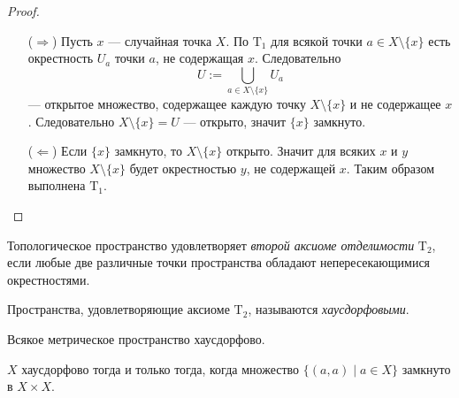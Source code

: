 \documentclass[12pt,a4paper]{article}
\newcommand{\T}{\ensuremath{\mathrm{T}}\xspace}
\begin{document}
    \begin{proof}
        \begin{itemize}
            \item[($\Rightarrow$)] Пусть $x$ --- случайная точка $X$. По $\T_1$ для всякой точки $a \in X \setminus \{x\}$ есть окрестность $U_a$ точки $a$, не содержащая $x$. Следовательно
                \[U := \bigcup_{a \in X \setminus \{x\}} U_a\]
                --- открытое множество, содержащее каждую точку $X \setminus \{x\}$ и не содержащее $x$. Следовательно $X \setminus \{x\} = U$ --- открыто, значит $\{x\}$ замкнуто.

            \item[($\Leftarrow$)] Если $\{x\}$ замкнуто, то $X \setminus \{x\}$ открыто. Значит для всяких $x$ и $y$ множество $X \setminus \{x\}$ будет окрестностью $y$, не содержащей $x$. Таким образом выполнена $\T_1$.
        \end{itemize}
    \end{proof}

    \begin{definition}
        Топологическое пространство удовлетворяет \emph{второй аксиоме отделимости} $\T_2$, если любые две различные точки пространства обладают непересекающимися окрестностями.

        Пространства, удовлетворяющие аксиоме $\T_2$, называются \emph{хаусдорфовыми}.
    \end{definition}

    \begin{remark*}
        Всякое метрическое пространство хаусдорфово.
    \end{remark*}

    \begin{theorem}
        $X$ хаусдорфово тогда и только тогда, когда множество $\{(a, a) \mid a \in X\}$ замкнуто в $X \times X$.
    \end{theorem}
\end{document}

